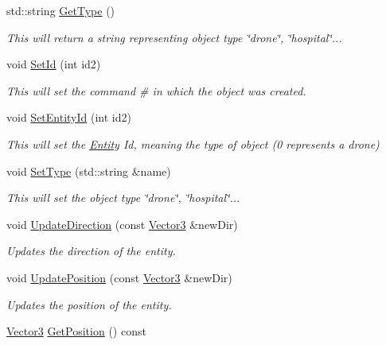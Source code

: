\begin{DoxyCompactItemize}
std\+::string \hyperlink{classBatteryDecorator_a606b100a52321dee5c36fe3942f8c396}{Get\+Type} ()
\begin{DoxyCompactList}\small\item\em This will return a string representing object type \char`\"{}drone\char`\"{}, \char`\"{}hospital\char`\"{}... \end{DoxyCompactList}\item 
void \hyperlink{classBatteryDecorator_aafe8d17f609556cfcb5537e38adc66f2}{Set\+Id} (int id2)
\begin{DoxyCompactList}\small\item\em This will set the command \# in which the object was created. \end{DoxyCompactList}\item 
void \hyperlink{classBatteryDecorator_a59bc5191357fdeb9a52ee6121d79b12d}{Set\+Entity\+Id} (int id2)
\begin{DoxyCompactList}\small\item\em This will set the \hyperlink{classEntity}{Entity} Id, meaning the type of object (0 represents a drone) \end{DoxyCompactList}\item 
void \hyperlink{classBatteryDecorator_a815d1943eef8e5f147158a043fe02825}{Set\+Type} (std\+::string \&name)
\begin{DoxyCompactList}\small\item\em This will set the object type \char`\"{}drone\char`\"{}, \char`\"{}hospital\char`\"{}... \end{DoxyCompactList}\item 
void \hyperlink{classBatteryDecorator_a42dfc0dc6cd4423f8113609ea7f5e938}{Update\+Direction} (const \hyperlink{classVector3}{Vector3} \&new\+Dir)
\begin{DoxyCompactList}\small\item\em Updates the direction of the entity. \end{DoxyCompactList}\item 
void \hyperlink{classBatteryDecorator_a7c338ca278f03c5c0fcea39885fc7d43}{Update\+Position} (const \hyperlink{classVector3}{Vector3} \&new\+Dir)
\begin{DoxyCompactList}\small\item\em Updates the position of the entity. \end{DoxyCompactList}\item 
\hyperlink{classVector3}{Vector3} \hyperlink{classBatteryDecorator_aaf2487adf2d58e855268877427cf5ba9}{Get\+Position} () const

\end{DoxyCompactItemize}
